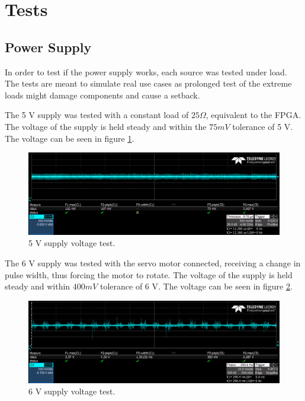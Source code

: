 \section{Tests}

\subsection{Power Supply} \label{sec:test_pwr_supply}

In order to test if the power supply works, each source was tested under load.
The tests are meant to simulate real use cases as prolonged test of the extreme loads might damage components and cause a setback.

The 5 V supply was tested with a constant load of $25 \Omega$, equivalent to the FPGA.
The voltage of the supply is held steady and within the $75 mV$ tolerance of 5 V.
The voltage can be seen in figure \ref{fig:5v_supply_test}.

\begin{figure}[h]
 \centering
 \includegraphics[width=0.9\linewidth]{img/5vsupply}
 \caption{5 V supply voltage test.}\label{fig:5v_supply_test}
\end{figure}

The 6 V supply was tested with the servo motor connected, receiving a change in pulse width, thus forcing the motor to rotate.
The voltage of the supply is held steady and within $400 mV$ tolerance of 6 V.
The voltage can be seen in figure \ref{fig:6v_supply_test}.

\begin{figure}[h]
 \centering
 \includegraphics[width=0.9\linewidth]{img/6vsupply}
 \caption{6 V supply voltage test.}\label{fig:6v_supply_test}
\end{figure}


